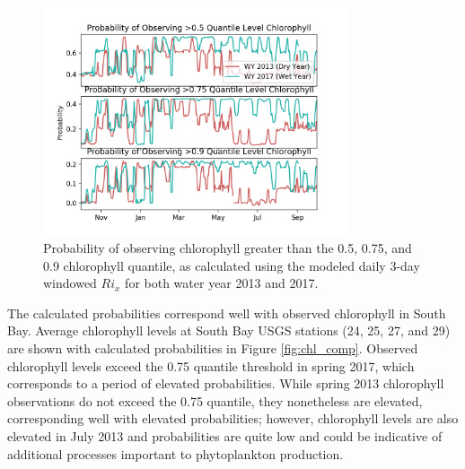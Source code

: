 \documentclass[preprint,review,12pt]{elsarticle}
\begin{document}
\begin{figure}[ht!]
\centering
\includegraphics[width=0.8\textwidth]{Figures/probability_chl_levels_wy13_wy17.png}
\caption{Probability of observing chlorophyll greater than the 0.5, 0.75, and 0.9 chlorophyll quantile, as calculated using the modeled daily 3-day windowed \(Ri_x\) for both water year 2013 and 2017.}
\label{fig:prob_levels}
\end{figure}
\FloatBarrier

The calculated probabilities correspond well with observed chlorophyll in South Bay. Average chlorophyll levels at South Bay USGS stations (24, 25, 27, and 29) are shown with calculated probabilities in Figure \ref{fig:chl_comp}. Observed chlorophyll levels exceed the 0.75 quantile threshold in spring 2017, which corresponds to a period of elevated probabilities. While spring 2013 chlorophyll observations do not exceed the 0.75 quantile, they nonetheless are elevated, corresponding well with elevated probabilities; however, chlorophyll levels are also elevated in July 2013 and probabilities are quite low and could be indicative of additional processes important to phytoplankton production. 
\end{document}
